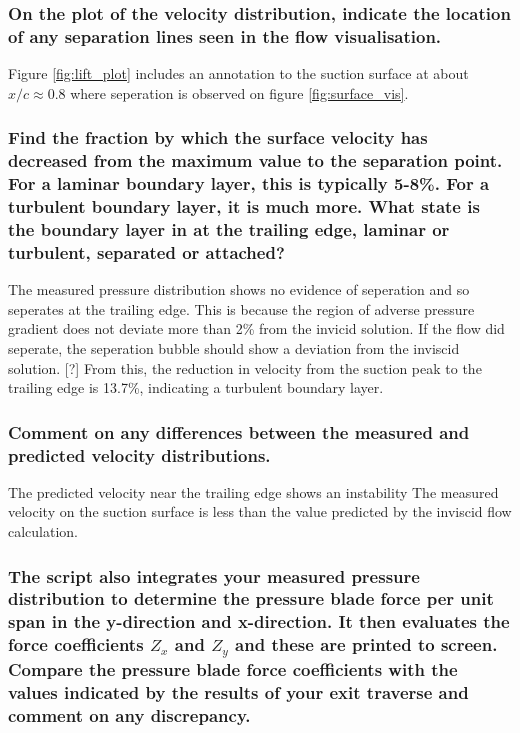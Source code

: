 \documentclass{article}
\begin{document}
\subsubsection{On the plot of the velocity distribution, indicate the location of any separation lines seen
in the flow visualisation.}

Figure \ref{fig:lift_plot} includes an annotation to the suction surface at about $x/c \approx 0.8$ where seperation is observed on figure \ref{fig:surface_vis}.

\subsubsection{Find the fraction by which the surface velocity has decreased from the maximum value
to the separation point. For a laminar boundary layer, this is typically 5-8\%. For a turbulent
boundary layer, it is much more. What state is the boundary layer in at the trailing edge, laminar
or turbulent, separated or attached?}

The measured pressure distribution shows no evidence of seperation and so seperates at the trailing edge.
This is because the region of adverse pressure gradient does not deviate more than 2\% from the invicid solution.
If the flow did seperate, the seperation bubble should show a deviation from the inviscid solution. [?] %
From this, the reduction in velocity from the suction peak to the trailing edge is 13.7\%, indicating a turbulent boundary layer.


\subsubsection{Comment on any differences between the measured and predicted velocity
distributions.}

The predicted velocity near the trailing edge shows an instability
The measured velocity on the suction surface is less than the value predicted by the inviscid flow calculation.


\subsubsection{The script also integrates your measured pressure distribution to determine the pressure
blade force per unit span in the y-direction and x-direction. It then evaluates the force
coefficients $Z_x$ and $Z_y$ and these are printed to screen.
Compare the pressure blade force coefficients with the values indicated by the results of your
exit traverse and comment on any discrepancy.}
\end{document}
